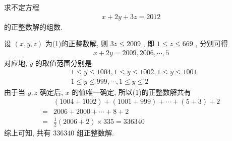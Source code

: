 \begin{example}
	求不定方程
	\begin{align*}
		x+2 y+3 z=2012
	\end{align*}
	的正整数解的组数.
\end{example}
\begin{solution}
	设 $(x, y, z)$ 为(1)的正整数解, 则 $3 z \leqslant 2009$ , 即 $1 \leqslant z \leqslant 669$ , 分别可得
	\begin{align*}
		x+2 y=2009,2006, \cdots, 5
	\end{align*}
	对应地, $y$ 的取值范围分别是
	\begin{align}
		 & 1 \leqslant y \leqslant 1004,1 \leqslant y \leqslant 1002,1 \leqslant y \leqslant 1001 \\
		 & 1 \leqslant y \leqslant 999, \cdots, 1 \leqslant y \leqslant 2
	\end{align}
	由于当 $y ,  z$ 确定后,  $x$ 的值唯一确定, 所以(1)的正整数解共有
	\begin{align}
		  & (1004+1002)+(1001+999)+\cdots+(5+3)+2 \\
		= & 2006+2000+\cdots+8+2                  \\
		= & \frac{1}{2}(2006+2) \times 335=336340
	\end{align}
	综上可知, 共有 336340 组正整数解.
\end{solution}

